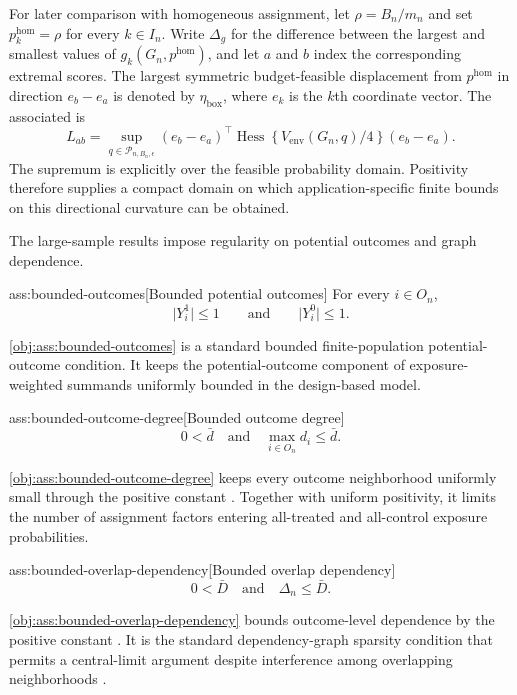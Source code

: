 \documentclass[11pt]{article}
\begin{document}
For later comparison with homogeneous assignment, let \(\rho=B_n/m_n\) and set \(p_k^{\mathrm{hom}}=\rho\) for every \(k\in I_n\). Write \(\Delta_g\) for the difference between the largest and smallest values of \(g_k(G_n,p^{\mathrm{hom}})\), and let \(a\) and \(b\) index the corresponding extremal scores. The largest symmetric budget-feasible displacement from \(p^{\mathrm{hom}}\) in direction \(e_b-e_a\) is denoted by \(\eta_{\mathrm{box}}\), where \(e_k\) is the \(k\)th coordinate vector. The associated  is
\[
L_{ab}
=
\sup_{q\in\mathcal P_{n,B_n,\epsilon}}
(e_b-e_a)^\top
\operatorname{Hess}\!\left\{V_{\mathrm{env}}(G_n,q)/4\right\}
(e_b-e_a).
\]
The supremum is explicitly over the feasible probability domain. Positivity therefore supplies a compact domain on which application-specific finite bounds on this directional curvature can be obtained.

The large-sample results impose regularity on potential outcomes and graph dependence.

\begin{assumptionv}{ass:bounded-outcomes}[Bounded potential outcomes]
For every $i\in O_n$,
\[
\lvert Y_i^1\rvert\leq 1
\qquad\text{and}\qquad
\lvert Y_i^0\rvert\leq 1.
\]
\end{assumptionv}

\cref{obj:ass:bounded-outcomes} is a standard bounded finite-population potential-outcome condition. It keeps the potential-outcome component of exposure-weighted summands uniformly bounded in the design-based model.

\begin{assumptionv}{ass:bounded-outcome-degree}[Bounded outcome degree]
\[
0 < \bar d
\quad\text{and}\quad
\max_{i\in O_n} d_i \leq \bar d.
\]
\end{assumptionv}

\cref{obj:ass:bounded-outcome-degree} keeps every outcome neighborhood uniformly small through the positive constant . Together with uniform positivity, it limits the number of assignment factors entering all-treated and all-control exposure probabilities.

\begin{assumptionv}{ass:bounded-overlap-dependency}[Bounded overlap dependency]
\[
0 < \bar D \quad\text{and}\quad \Delta_n \le \bar D.
\]
\end{assumptionv}

\cref{obj:ass:bounded-overlap-dependency} bounds outcome-level dependence by the positive constant . It is the standard dependency-graph sparsity condition that permits a central-limit argument despite interference among overlapping neighborhoods \citep{AronowSamii2017GeneralInterference}.
\end{document}
